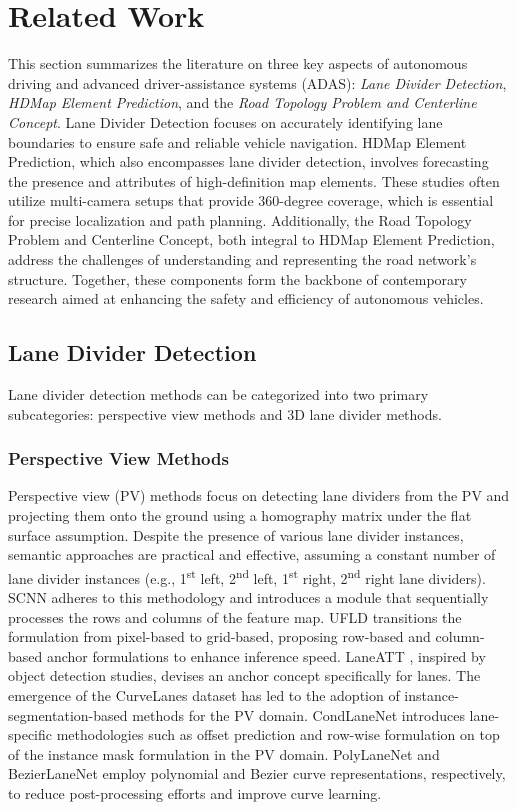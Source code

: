 \section{Related Work}
This section summarizes the literature on three key aspects of autonomous driving and advanced driver-assistance systems (ADAS): \emph{Lane Divider Detection}, \emph{HDMap Element Prediction}, and the \emph{Road Topology Problem and Centerline Concept}. Lane Divider Detection focuses on accurately identifying lane boundaries to ensure safe and reliable vehicle navigation. HDMap Element Prediction, which also encompasses lane divider detection, involves forecasting the presence and attributes of high-definition map elements. These studies often utilize multi-camera setups that provide 360-degree coverage, which is essential for precise localization and path planning. Additionally, the Road Topology Problem and Centerline Concept, both integral to HDMap Element Prediction, address the challenges of understanding and representing the road network's structure. Together, these components form the backbone of contemporary research aimed at enhancing the safety and efficiency of autonomous vehicles.


\subsection{Lane Divider Detection} Lane divider detection methods can be categorized into two primary subcategories: perspective view methods and 3D lane divider methods.

\subsubsection{Perspective View Methods} Perspective view (PV) methods focus on detecting lane dividers from the PV and projecting them onto the ground using a homography matrix under the flat surface assumption. Despite the presence of various lane divider instances, semantic approaches are practical and effective, assuming a constant number of lane divider instances (e.g., 1\textsuperscript{st} left, 2\textsuperscript{nd} left, 1\textsuperscript{st} right, 2\textsuperscript{nd} right lane dividers). SCNN \cite{pan2018spatial} adheres to this methodology and introduces a module that sequentially processes the rows and columns of the feature map. UFLD \cite{qin2022ultra} transitions the formulation from pixel-based to grid-based, proposing row-based and column-based anchor formulations to enhance inference speed. LaneATT \cite{tabelini2021keep}, inspired by object detection studies, devises an anchor concept specifically for lanes. The emergence of the CurveLanes dataset \cite{xu2020curvelane} has led to the adoption of instance-segmentation-based methods for the PV domain. CondLaneNet \cite{liu2021condlanenet} introduces lane-specific methodologies such as offset prediction and row-wise formulation on top of the instance mask formulation in the PV domain. PolyLaneNet \cite{tabelini2021polylanenet} and BezierLaneNet \cite{feng2022rethinking} employ polynomial and Bezier curve representations, respectively, to reduce post-processing efforts and improve curve learning. 

